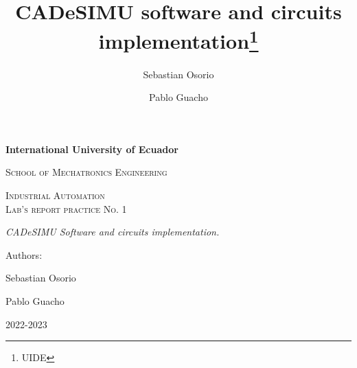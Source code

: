 \documentclass[runningheads]{llncs}
\begin{document}
%
\begin{titlepage}
    \centering
    {\bfseries\LARGE International University of Ecuador \par}
    \vspace{1cm}
    {\scshape\Large School of Mechatronics Engineering \par}
    \vspace{3cm}
    {\scshape\Huge Industrial Automation \\ Lab's report practice No. 1\par}
    \vspace{3cm}
    {\itshape\Large CADeSIMU Software and circuits implementation. \par}
    \vfill
    {\Large Authors: \par}
    {\Large Sebastian Osorio \par}
    {\Large Pablo Guacho \par}
    \vfill
    {\Large 2022-2023 \par}
\end{titlepage}
\newpage
\title{CADeSIMU software and circuits implementation\thanks{UIDE}}

\author{Sebastian Osorio
    \and
    Pablo Guacho
}



\maketitle
\end{document}
